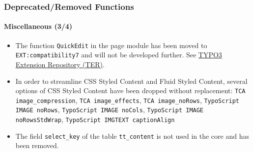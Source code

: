 \begin{frame}[fragile]
	\frametitle{Deprecated/Removed Functions}
	\framesubtitle{Miscellaneous (3/4)}

	\begin{itemize}
		\item The function \texttt{QuickEdit} in the page module has been moved to
			\texttt{EXT:compatibility7} and will not be developed further.\newline
			See \href{https://typo3.org/extensions/repository}{TYPO3 Extension Repository (TER)}.

		\item In order to streamline CSS Styled Content and Fluid Styled Content, several
			options of CSS Styled Content have been dropped without replacement:
			\texttt{TCA image\_compression}, \texttt{TCA image\_effects}, \texttt{TCA image\_noRows},
			\texttt{TypoScript IMAGE noRows}, \texttt{TypoScript IMAGE noCols},
			\texttt{TypoScript IMAGE noRowsStdWrap}, \texttt{TypoScript IMGTEXT captionAlign}

		\item The field \texttt{select\_key} of the table \texttt{tt\_content} is not used
			in the core and has been removed.

	\end{itemize}

\end{frame}


